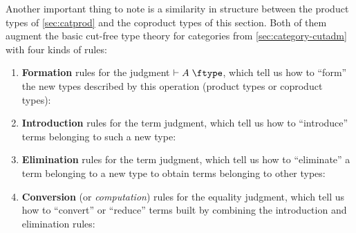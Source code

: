 Another important thing to note is a similarity in structure between the product types of \cref{sec:catprod} and the coproduct types of this section.
Both of them augment the basic cut-free type theory for categories from \cref{sec:category-cutadm} with four kinds of rules:
\begin{enumerate}
\item \textbf{Formation} rules for the judgment $\types A\type$, which tell us how to ``form'' the new types described by this operation (product types or coproduct types):
\item \textbf{Introduction} rules for the term judgment, which tell us how to ``introduce'' terms belonging to such a new type:
\item \textbf{Elimination} rules for the term judgment, which tell us how to ``eliminate'' a term belonging to a new type to obtain terms belonging to other types:
\item \textbf{Conversion} (or \emph{computation}) rules for the equality judgment, which tell us how to ``convert'' or ``reduce'' terms built by combining the introduction and elimination rules:
\end{enumerate}

